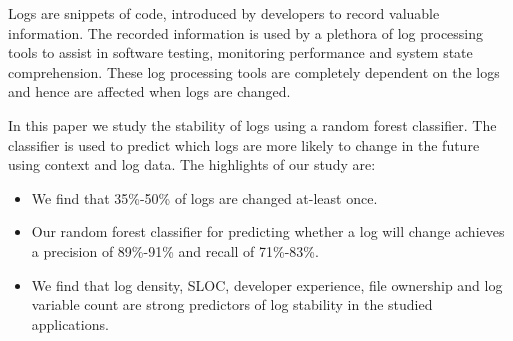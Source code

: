 Logs are snippets of code, introduced by developers to record valuable information. The recorded information is used by a plethora of log processing tools to assist in software testing, monitoring performance and system state comprehension. These log processing tools are completely dependent on the logs and hence are affected when logs are changed.

 In this paper we study the stability of logs using a random forest classifier. The classifier is used to predict which logs are more likely to change in the future using context and log data.  The highlights of our study are:

\begin{itemize}
	\item We find that 35\%-50\% of logs are changed at-least once.
	\item Our random forest classifier for predicting whether a log will change achieves a precision of 89\%-91\% and recall of 71\%-83\%. 
	\item We find that log density, SLOC, developer experience, file ownership and log variable count are strong predictors of log stability in the studied applications.  	
	
\end{itemize}




